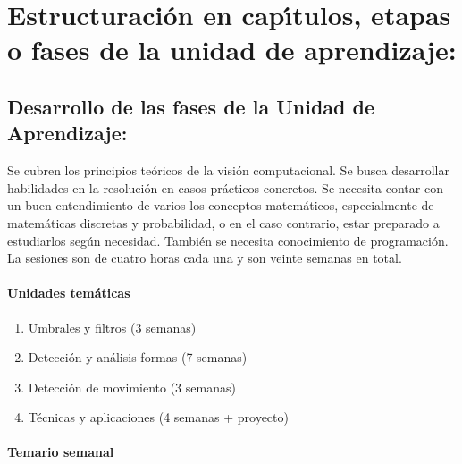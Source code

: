 \section{Estructuraci\'{o}n en cap\'{\i}tulos, etapas o fases de la unidad de
  aprendizaje:}

\subsection{Desarrollo de las fases de la Unidad de Aprendizaje:}

\quad

Se cubren los principios te\'{o}ricos de la visi\'{o}n computacional.  Se
busca desarrollar habilidades en la resoluci\'{o}n en casos
pr\'{a}cticos concretos. Se necesita contar con un buen entendimiento
de varios los conceptos matem\'{a}ticos, especialmente de
matem\'{a}ticas discretas y probabilidad, o en el caso contrario,
estar preparado a estudiarlos seg\'{u}n necesidad. Tambi\'{e}n se
necesita conocimiento de programaci\'{o}n.  La sesiones son de cuatro
horas cada una y son veinte semanas en total.

\paragraph{Unidades tem\'{a}ticas}

\begin{enumerate}[itemsep=-3pt]
\item Umbrales y filtros (3 semanas)
\item Detecci\'{o}n y an\'{a}lisis formas (7 semanas)
\item Detecci\'{o}n de movimiento (3 semanas)
\item T\'{e}cnicas y aplicaciones (4 semanas + proyecto)
\end{enumerate}
  
\paragraph{Temario semanal}

